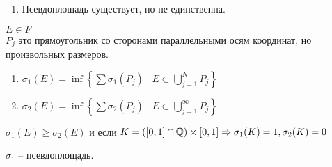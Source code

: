 \begin{remark}
\begin{enumerate}
\begin{tikzpicture}[x=0.75pt,y=0.75pt,yscale=-0.75,xscale=0.75]
        \end{tikzpicture}

        \item Псевдоплощадь существует, но не единственна.
    \end{enumerate}
\end{remark}

\begin{example}
    $E \in F$ \\
    $P_j$ это прямоугольник со сторонами параллельными осям координат, но произвольных размеров.
    \begin{enumerate}
        \item $\sigma_1(E) = \inf \left\{ \sum \sigma_1(P_j) \mid E \subset \bigcup\limits_{j=1}^N P_j \right\}$
        \item $\sigma_2(E) = \inf \left\{ \sum \sigma_2(P_j) \mid E \subset \bigcup\limits_{j=1}^\infty P_j \right\}$
    \end{enumerate}
    \begin{remark}
        $\sigma_1(E) \geq \sigma_2(E)$ и если $K = ([0, 1] \cap \Q) \times [0, 1] \Rightarrow \sigma_1(K) = 1, \sigma_2(K) = 0$
    \end{remark}
\end{example}

\begin{theorem}
    $\sigma_1$ -- псевдоплощадь. 
\end{theorem}

